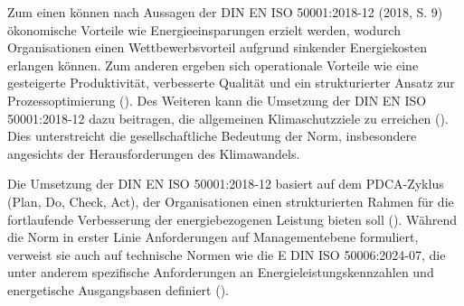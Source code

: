 Zum einen können nach Aussagen der DIN EN ISO 50001:2018-12 (2018, S. 9) ökonomische Vorteile wie Energieeinsparungen erzielt werden, wodurch Organisationen einen Wettbewerbsvorteil
aufgrund sinkender Energiekosten erlangen können. Zum anderen ergeben sich operationale Vorteile wie eine gesteigerte Produktivität, verbesserte Qualität
und ein strukturierter Ansatz zur Prozessoptimierung (\cite{Marimon.2017}). Des Weiteren kann die Umsetzung der DIN EN ISO 50001:2018-12 dazu beitragen, die allgemeinen
Klimaschutzziele zu erreichen (\cite{DIN50001.2018}). Dies unterstreicht die gesellschaftliche Bedeutung der Norm, insbesondere angesichts der Herausforderungen
des Klimawandels.

Die Umsetzung der DIN EN ISO 50001:2018-12 basiert auf dem PDCA-Zyklus (Plan, Do, Check, Act), der Organisationen einen strukturierten Rahmen für die fortlaufende
Verbesserung der energiebezogenen Leistung bieten soll (\cite[S. 7f.]{DIN50001.2018}).
Während die Norm in erster Linie Anforderungen auf Managementebene formuliert, verweist sie auch auf technische Normen wie die E DIN ISO 50006:2024-07, die unter anderem
spezifische Anforderungen an Energieleistungskennzahlen und energetische Ausgangsbasen definiert (\cite{DIN50006.2024,DIN50001.2018}).
